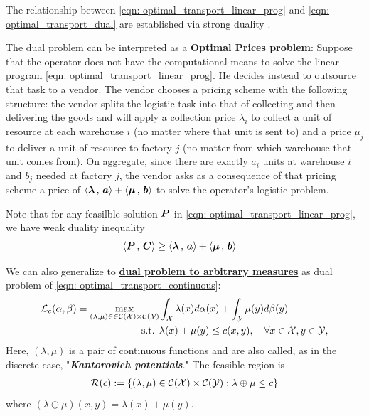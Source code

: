 \documentclass[11pt]{article}
\begin{document}
The relationship between \eqref{eqn: optimal_transport_linear_prog} and \eqref{eqn: optimal_transport_dual} are established via strong duality \citep{bertsimas1997introduction}.  

The dual problem can be interpreted as a \textbf{Optimal Prices problem}: Suppose that the operator does not have the computational
means to solve the linear program \eqref{eqn: optimal_transport_linear_prog}. He decides instead to outsource that task to a vendor. The vendor chooses a pricing scheme with the following structure: the vendor splits the logistic task into that of collecting and then delivering the goods and will apply a collection price $\lambda_i$ to collect a unit of resource at each warehouse $i$ (no matter where that unit is sent to) and a price $\mu_j$ to deliver a unit of resource to factory $j$ (no matter from which warehouse that unit comes from). On aggregate, since there are exactly $a_i$ units at warehouse $i$ and $b_j$ needed at factory $j$, the vendor asks as a consequence of that pricing scheme a price of $\left\langle \boldsymbol{\lambda}\,,\, \boldsymbol{a} \right\rangle + \left\langle \boldsymbol{\mu}\,,\, \boldsymbol{b} \right\rangle$ to solve the operator’s logistic problem.

Note that for any feasilble solution $\boldsymbol{P}$ in \eqref{eqn: optimal_transport_linear_prog}, we have weak duality inequality
\begin{align*}
\left\langle \boldsymbol{P}\,,\, \boldsymbol{C} \right\rangle &\ge \left\langle \boldsymbol{\lambda}\,,\, \boldsymbol{a} \right\rangle + \left\langle \boldsymbol{\mu}\,,\, \boldsymbol{b} \right\rangle
\end{align*}

We can also generalize to  \underline{\textbf{dual problem to arbitrary measures}} as dual problem of \eqref{eqn: optimal_transport_continuous}: 
\begin{align}
{\mathcal L}_{c}(\alpha, \beta) = \max_{(\lambda,  \mu) \in \in {\mathcal C}({\mathcal X})\times {\mathcal C}({\mathcal Y})} & \int_{{\mathcal X}}\lambda(x) d\alpha(x) + \int_{{\mathcal Y}}\mu(y) d\beta(y) \label{eqn: optimal_transport_dual_cont} \\
\text{s.t. }&  \lambda(x) + \mu(y) \le c(x, y),\quad \forall x\in {\mathcal X}, y \in {\mathcal Y}, \label{eqn: optimal_transport_dual_cont_constraint}
\end{align} Here, $(\lambda, \mu)$ is a pair of continuous functions and are also called, as in the discrete case, "\textbf{\emph{Kantorovich potentials}}." The feasible region is 
 \begin{align}
{\mathcal R}(c) := \left\{(\lambda,  \mu) \in  {\mathcal C}({\mathcal X})\times {\mathcal C}({\mathcal Y}): \lambda \oplus \mu \le c\right\} \label{eqn: optimal_transport_dual_cont_feasible_set}
\end{align} where $( \lambda \oplus \mu)(x, y)=  \lambda(x) + \mu(y)$.
\end{document}
